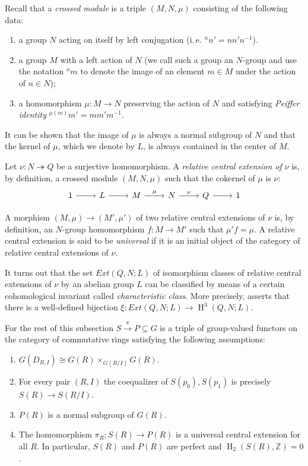 \documentclass[oneside, 8pt]{amsart}
\theoremstyle{remark}
\theoremstyle{definition}
\numberwithin{lemma}{section}
\numberwithin{prop}{section}
\numberwithin{corollary}{section}
\numberwithin{externaltheorem}{section}
\DeclareMathOperator{\HH}{H}
\newcommand{\ZZ}{\mathbb{Z}}
\numberwithin{equation}{section}
\begin{document}
Recall that a {\it crossed module} is a triple $(M, N, \mu)$ consisting of the following data:
\begin{enumerate} [label=\normalfont(\arabic*)]
 \item a group $N$ acting on itself by left conjugation (i.\,e. ${}^{n}\!n' = n n' n^{-1}$).
 \item a group $M$ with a left action of $N$ (we call such a group an $N$-group and use the notation ${}^n m$ to denote the image of an element $m\in M$ under the action of $n \in N$);
 \item a homomorphism $\mu \colon M\to N$ preserving the action of $N$ and satisfying {\it Peiffer identity} ${}^{\mu(m)}\!m' = m m' m^{-1}$.
\end{enumerate}
It can be shown that the image of $\mu$ is always a normal subgroup of $N$ and that the kernel of $\mu$, which we denote by $L$, is always contained in the center of $M$.
 
Let $\nu \colon N \twoheadrightarrow Q$ be a surjective homomorphism.
A {\it relative central extension of $\nu$} is, by definition,
a crossed module $(M, N, \mu)$ such that the cokernel of $\mu$ is $\nu$:
\begin{equation} \label{RelativeCentralExtension} \begin{tikzcd} 1 \arrow{r} & L \arrow{r} & M \arrow{r}{\mu} & N \arrow{r}{\nu} & Q \arrow{r} & 1 \end{tikzcd} \end{equation}

A morphism $(M, \mu) \to (M', \mu')$ of two relative central extensions of $\nu$ is, by definition, an $N$-group homomorphism $f\colon M \to M'$ such that $\mu' f = \mu$. 
A relative central extension is said to be {\it universal} if it is an initial object of the category of relative central extensions of $\nu$. 

It turns out that the set $Ext(Q, N; L)$ of isomorphism classes of relative central extensions of $\nu$ by an abelian group $L$ can be classified by means of a certain cohomological invariant called {\it characteristic class}. More precisely, \cite[Th{\'e}or{\`e}me~1]{Lo78} asserts that there is a well-defined bijection $\xi \colon Ext(Q, N; L) \to \HH^3(Q, N; L)$.
 
For the rest of this subsection $S \xrightarrow{\pi} P \subseteq G$ is a triple of group-valued functors on the category of commutative rings satisfying the following assumptions:
\begin{enumerate} [label=\normalfont(A\arabic*)]
 \item \label{req:left-exact} $G(D_{R, I}) \cong G(R) \times_{G(R/I)} G(R)$.
 \item \label{req:coeq} For every pair $(R, I)$ the coequalizer of $S(p_0), S(p_1)$ is precisely $S(R) \to S(R/I)$.
 \item \label{req:subfunc} $P(R)$ is a normal subgroup of $G(R)$.
 \item \label{req:uce} The homomorphism $ \pi_R \colon S(R) \to P(R)$ is a universal central extension for all $R$. In particular, $S(R)$ and $P(R)$ are perfect and $\HH_2(S(R), \ZZ) = 0$.
\end{enumerate}
\end{document}
